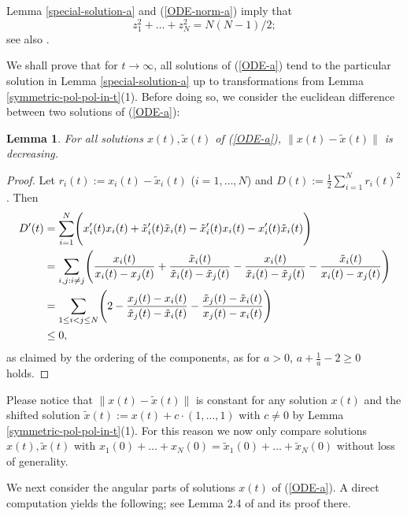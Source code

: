 \documentclass[reqno]{amsart}
\theoremstyle{plain}
\newtheorem{lemma}[theorem]{Lemma}
\theoremstyle{definition}
\numberwithin{equation}{section}
\begin{document}
Lemma \ref{special-solution-a} and (\ref{ODE-norm-a})  imply that
\begin{equation}\label{ODE-norm-hermite-zeros}
  z_1^2+\ldots+z_N^2=N(N-1)/2;
\end{equation}
see also  \cite{AKM1}.


We shall prove that for $t\to\infty$, all solutions of  (\ref{ODE-a}) tend to the particular solution 
in Lemma \ref{special-solution-a} up to  transformations from Lemma \ref{symmetric-pol-pol-in-t}(1).
Before doing so, we consider the euclidean difference between two solutions of (\ref{ODE-a}):

 \begin{lemma}\label{decreasing-error-a}
For all solutions $x(t),\tilde x(t)$ of  (\ref{ODE-a}),  $\|x(t)-\tilde x(t)\|$ is decreasing.
 \end{lemma}


 \begin{proof}
   Let $r_i(t):=x_i(t)-\tilde x_i(t)$ ($i=1,\ldots,N$) and $D(t):=\frac{1}{2}\sum_{i=1}^N r_i(t)^2$. Then
   \begin{align}\label{error-est-a}
     D^\prime(t) &= \sum_{i=1}^N\Biggl( x_i^\prime(t)x_i(t) +\tilde x_i^\prime(t)\tilde x_i(t)- {\tilde x_i}^\prime(t)x_i(t)- x_i^\prime(t)\tilde x_i(t)
     \Biggr)\notag\\
     &= \sum_{i,j: i\ne j}\Biggl(\frac{x_i(t)}{x_i(t)-x_j(t)}+\frac{\tilde x_i(t)}{\tilde x_i(t)-\tilde x_j(t)}-
     \frac{ x_i(t)}{\tilde x_i(t)-\tilde x_j(t)}-\frac{\tilde x_i(t)}{ x_i(t)- x_j(t)} \Biggr)\notag\\
     &= \sum_{1\le i< j\le N} \Biggl(2-  \frac{ x_j(t) - x_i(t)}{\tilde x_j(t)-\tilde x_i(t)}- \frac{\tilde x_j(t) -\tilde x_i(t)}{x_j(t)- x_i(t)}
     \Biggr)\notag\\
     &\le0,
   \end{align}
as claimed by the ordering of the components, as for $a>0$, $a+\frac{1}{a}-2\ge 0$ holds.
   \end{proof}

 Please notice that  $\|x(t)-\tilde x(t)\|$ is constant for any  solution $x(t)$ and the shifted solution
$\tilde x(t):=x(t)+c\cdot(1,\ldots,1)$ with  $c\ne 0$ by Lemma \ref{symmetric-pol-pol-in-t}(1).
For this reason we  now  only compare  solutions  $x(t),\tilde x(t)$ with $x_1(0)+\ldots+ x_N(0)=\tilde x_1(0)+\ldots+ \tilde x_N(0)$
without loss of generality.

We next consider the angular parts  of   solutions  $x(t)$ of (\ref{ODE-a}).
A direct computation yields the following; see Lemma 2.4 of \cite{VW3} and its proof there.
\end{document}
